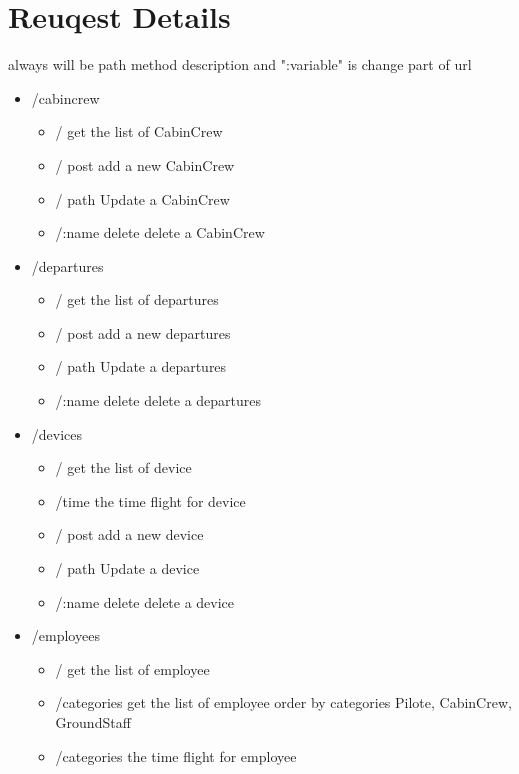 \documentclass{article}
\begin{document}
    \section{Reuqest Details} 
    always will be path method description and ":variable" is change part of url
    \begin{itemize}
        \item /cabincrew 
                \begin{itemize}
                    \item / get the list of CabinCrew
                    \item / post add a new CabinCrew  
                    \item / path Update a CabinCrew
                    \item /:name delete delete a CabinCrew
                \end{itemize}
        \item /departures
            \begin{itemize}
                \item / get the list of departures
                \item / post add a new departures  
                \item / path Update a departures
                \item /:name delete delete a departures
            \end{itemize}
        \item /devices
            \begin{itemize}
                \item / get the list of device
                \item /time the time flight for device
                \item / post add a new device  
                \item / path Update a device
                \item /:name delete delete a device
            \end{itemize}
        \item /employees
            \begin{itemize}
                \item / get the list of employee
                \item /categories get the list of employee order by categories Pilote, CabinCrew, GroundStaff
                \item /categories the time flight for employee

\end{itemize}
\end{itemize}
\end{document}
